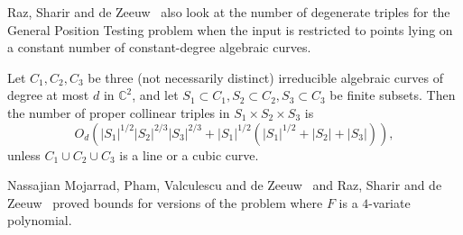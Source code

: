 Raz, Sharir and de Zeeuw~\cite{RSZ15} also look at the number of degenerate
triples for the General Position Testing problem when the input is restricted
to points lying on a constant number of constant-degree algebraic curves.
\begin{theorem}\label{thm:rsz15:col}
Let $C_1, C_2, C_3$ be three (not necessarily distinct) irreducible algebraic curves
of degree at most $d$ in $\mathbb{C}^2$, and let $S_1 \subset C_1, S_2 \subset C_2, S_3
\subset C_3$ be finite subsets. Then the
number of proper collinear triples in $S_1 \times S_2 \times S_3$ is
\begin{displaymath}
	O_d( |S_1|^{1/2} |S_2|^{2/3} |S_3|^{2/3} + |S_1|^{1/2} (|S_1|^{1/2} + |S_2| +
|S_3| ) ),
\end{displaymath}
unless $C_1 \cup C_2 \cup C_3$ is a line or a cubic curve.
\end{theorem}

Nassajian Mojarrad, Pham, Valculescu and de Zeeuw~\cite{MPVd16} and
Raz, Sharir and de Zeeuw~\cite{RSZ16} proved bounds for versions of the
problem where $F$ is a $4$-variate polynomial.
